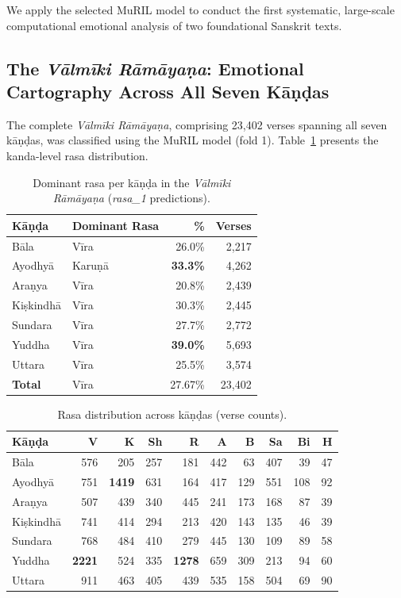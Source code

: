 \documentclass[11pt]{article}
\begin{document}
We apply the selected MuRIL model to conduct the first systematic, large-scale computational emotional analysis of two foundational Sanskrit texts.

\subsection{The \textit{V\=alm\=iki R\=am\=aya\d na}: Emotional Cartography Across All Seven K\=a\d n\d das}

The complete \textit{V\=alm\=iki R\=am\=aya\d na}, comprising 23,402 verses spanning all seven k\=a\d n\d das, was classified using the MuRIL model (fold 1). Table~\ref{tab:kanda_dominant} presents the kanda-level rasa distribution.

\begin{table}[htbp]
\centering
\small
\caption{Dominant rasa per k\=a\d n\d da in the \textit{V\=alm\=iki R\=am\=aya\d na} (\textit{rasa\_1} predictions).}
\label{tab:kanda_dominant}
\begin{tabular}{llrr}
\toprule
K\=a\d n\d da & Dominant Rasa & \% & Verses \\
\midrule
B\=ala          & V\=ira        & 26.0\% & 2,217 \\
Ayodhy\=a       & Karu\d n\=a   & \textbf{33.3\%} & 4,262 \\
Ara\d nya        & V\=ira        & 20.8\% & 2,439 \\
Ki\d skindh\=a   & V\=ira        & 30.3\% & 2,445 \\
Sundara         & V\=ira        & 27.7\% & 2,772 \\
Yuddha          & V\=ira        & \textbf{39.0\%} & 5,693 \\
Uttara          & V\=ira        & 25.5\% & 3,574 \\
\midrule
\textbf{Total}  & V\=ira        & 27.67\% & 23,402 \\
\bottomrule
\end{tabular}
\end{table}

\begin{table}[htbp]
\centering
\normalsize
\caption{Rasa distribution across k\=a\d n\d das (verse counts).}
\label{tab:kanda_full}
\begin{tabular}{@{}lrrrrrrrrr@{}}
\toprule
K\=a\d n\d da & V & K & Sh & R & A & B & Sa & Bi & H \\
\midrule
B\=ala     & 576 & 205 & 257 & 181 & 442 & 63  & 407 & 39  & 47  \\
Ayodhy\=a  & 751 &\textbf{1419}& 631 & 164 & 417 & 129 & 551 & 108 & 92  \\
Ara\d nya   & 507 & 439 & 340 & 445 & 241 & 173 & 168 & 87  & 39  \\
Ki\d skindh\=a& 741 & 414 & 294 & 213 & 420 & 143 & 135 & 46  & 39  \\
Sundara    & 768 & 484 & 410 & 279 & 445 & 130 & 109 & 89  & 58  \\
Yuddha     &\textbf{2221}& 524 & 335 &\textbf{1278}& 659 & 309 & 213 & 94  & 60  \\
Uttara     & 911 & 463 & 405 & 439 & 535 & 158 & 504 & 69  & 90  \\
\bottomrule
\end{tabular}
\end{table}
\end{document}
